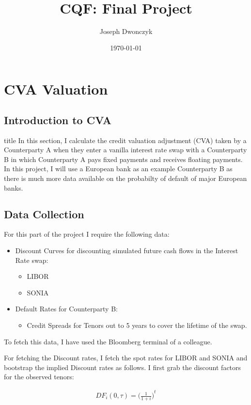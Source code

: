 \documentclass{report}
\theoremstyle{plain}
\theoremstyle{definition}
\begin{document}
\title{CQF: Final Project}
\author{Joseph Dwonczyk }
\date{\today}
\maketitle

\part{CVA Valuation}
\chapter{Introduction to CVA}title
In this section, I calculate the credit valuation adjustment (CVA) taken by a Counterparty A when they enter a vanilla interest rate swap with a Counterparty B in which Counterparty A pays fixed payments and receives floating payments. In this project, I will use a European bank as an example Counterparty B as there is much more data available on the probabilty of default of major European banks. 

\chapter{Data Collection}
For this part of the project I require the following data:
\begin{itemize}
	\item Discount Curves for discounting simulated future cash flows in the Interest Rate swap:
	\begin{itemize}
		\item LIBOR
		\item SONIA
	\end{itemize}
	\item Default Rates for Counterparty B:
	\begin{itemize}
		\item Credit Spreads for Tenors out to 5 years to cover the lifetime of the swap. 
	\end{itemize}	

\end{itemize}

To fetch this data, I have used the Bloomberg terminal of a colleague.

For fetching the Discount rates, I fetch the spot rates for LIBOR and SONIA and bootstrap the implied Discount rates as follows. I first grab the discount factors for the observed tenors:

\begin{align*}
	DF_{i}(0,\tau) = {\Big(\frac{1}{1+i}\Big)}^{t}
\end{align*}
\end{document}
